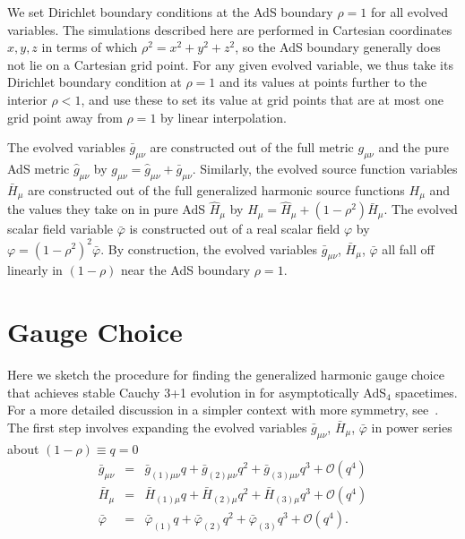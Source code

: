 \documentclass[12pt]{iopart}
\begin{document}
We set Dirichlet boundary conditions at the AdS boundary $\rho=1$ for all evolved variables. 
The simulations described here are performed in Cartesian coordinates $x,y,z$ in terms of which $\rho^2=x^2+y^2+z^2$, so the AdS boundary generally does not lie on a Cartesian grid point. 
For any given evolved variable, we thus take its Dirichlet boundary condition at $\rho=1$ and its values at points further to the interior $\rho<1$, and use these to set its value at grid points that are at most one grid point away from $\rho=1$ by linear interpolation.

The evolved variables $\bar{g}_{\mu\nu}$ are constructed out of the full metric $g_{\mu\nu}$ and the pure AdS metric $\hat{g}_{\mu\nu}$ by $g_{\mu\nu} = \hat{g}_{\mu\nu} + \bar{g}_{\mu\nu}$. 
Similarly, the evolved source function variables $\bar{H}_\mu$ are constructed out of the full generalized harmonic source functions $H_\mu$ and the values they take on in pure AdS $\hat{H}_\mu$ by $H_\mu = \hat{H}_\mu + (1-\rho^2) \bar{H}_\mu$.
The evolved scalar field variable $\bar{\varphi}$ is constructed out of a real scalar field $\varphi$ by
$\varphi = (1-\rho^2)^2 \bar{\varphi}$.
By construction, the evolved variables $\bar{g}_{\mu \nu}$, $\bar{H}_{\mu}$, $\bar{\varphi}$ all fall off linearly in $(1-\rho)$ near the AdS boundary $\rho=1$. 



\section{Gauge Choice}\label{sec:gauge_choice}

Here we sketch the procedure for finding the generalized harmonic gauge choice that achieves stable Cauchy 3+1 evolution in for asymptotically AdS$_4$ spacetimes.
For a more detailed discussion in a simpler context with more symmetry, see~\cite{Bantilan:2012vu}. 
The first step involves expanding the evolved variables $\bar{g}_{\mu \nu}$, $\bar{H}_{\mu}$, $\bar{\varphi}$ in power series about $(1-\rho) \equiv q = 0$
\begin{eqnarray}\label{eqn:qexp}
\bar{g}_{\mu \nu} &=& \bar{g}_{(1) \mu \nu} q + \bar{g}_{(2) \mu \nu} q^2 + \bar{g}_{(3) \mu \nu} q^3 + \mathcal{O}(q^4) \nonumber \\
\bar{H}_{\mu} &=& \bar{H}_{(1) \mu} q + \bar{H}_{(2) \mu} q^2 + \bar{H}_{(3) \mu} q^3 + \mathcal{O}(q^4) \nonumber \\
\bar{\varphi} &=& \bar{\varphi}_{(1)} q + \bar{\varphi}_{(2)} q^2 + \bar{\varphi}_{(3)} q^3 + \mathcal{O}(q^4). 
\end{eqnarray}
\end{document}
